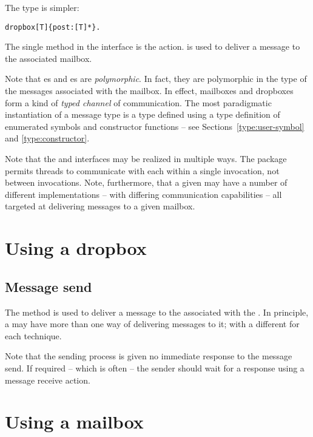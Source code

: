 The  type is simpler:
\begin{alltt}
dropbox[T] \impl \{ post:[T]* \}.
\end{alltt}
The single method in the  interface is the  action.  is used to deliver a message to the associated mailbox. 

Note that es and es are \emph{polymorphic}. In fact, they are polymorphic in the type of the messages associated with the mailbox. In effect, mailboxes and dropboxes form a kind of \emph{typed channel} of communication. The most paradigmatic instantiation of a message type is a type defined using a type definition of enumerated symbols and constructor functions -- see Sections~\vref{type:user-symbol} and \vref{type:constructor}.

Note that the  and  interfaces may be realized in multiple ways. The  package permits threads to communicate with each within a single \go invocation, not between invocations. Note, furthermore, that a given  may have a number of different  implementations -- with differing communication capabilities -- all targeted at delivering messages to a given mailbox.


\section{Using a dropbox}
\label{message:dropbox}

\subsection{Message send}
\label{action:send}

\noindent
The  method is used to deliver a message to the  associated with the . In principle, a  may have more than one way of delivering messages to it; with a different  for each technique.

Note that the sending process is given no immediate response to the message send. If required -- which is often -- the sender should wait for a response using a message receive action.

\section{Using a mailbox}

